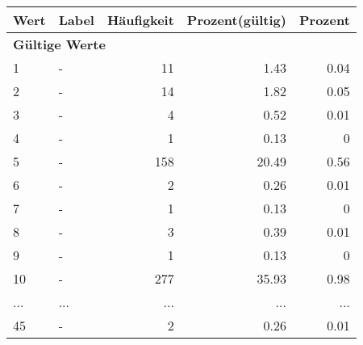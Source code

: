      \begin{longtable}{lXrrr}
     \toprule
     \textbf{Wert} & \textbf{Label} & \textbf{Häufigkeit} & \textbf{Prozent(gültig)} & \textbf{Prozent} \\
     \endhead
     \midrule
     \multicolumn{5}{l}{\textbf{Gültige Werte}}\\
        1 & \multicolumn{1}{X}{-} & %
          \num{11} &
          \num[round-mode=places,round-precision=2]{1,43} &
          \num[round-mode=places,round-precision=2]{0,04} \\
        2 & \multicolumn{1}{X}{-} & %
          \num{14} &
          \num[round-mode=places,round-precision=2]{1,82} &
          \num[round-mode=places,round-precision=2]{0,05} \\
        3 & \multicolumn{1}{X}{-} & %
          \num{4} &
          \num[round-mode=places,round-precision=2]{0,52} &
          \num[round-mode=places,round-precision=2]{0,01} \\
        4 & \multicolumn{1}{X}{-} & %
          \num{1} &
          \num[round-mode=places,round-precision=2]{0,13} &
          \num[round-mode=places,round-precision=2]{0} \\
        5 & \multicolumn{1}{X}{-} & %
          \num{158} &
          \num[round-mode=places,round-precision=2]{20,49} &
          \num[round-mode=places,round-precision=2]{0,56} \\
        6 & \multicolumn{1}{X}{-} & %
          \num{2} &
          \num[round-mode=places,round-precision=2]{0,26} &
          \num[round-mode=places,round-precision=2]{0,01} \\
        7 & \multicolumn{1}{X}{-} & %
          \num{1} &
          \num[round-mode=places,round-precision=2]{0,13} &
          \num[round-mode=places,round-precision=2]{0} \\
        8 & \multicolumn{1}{X}{-} & %
          \num{3} &
          \num[round-mode=places,round-precision=2]{0,39} &
          \num[round-mode=places,round-precision=2]{0,01} \\
        9 & \multicolumn{1}{X}{-} & %
          \num{1} &
          \num[round-mode=places,round-precision=2]{0,13} &
          \num[round-mode=places,round-precision=2]{0} \\
        10 & \multicolumn{1}{X}{-} & %
          \num{277} &
          \num[round-mode=places,round-precision=2]{35,93} &
          \num[round-mode=places,round-precision=2]{0,98} \\
       ... & ... & ... & ... & ... \\
        45 & \multicolumn{1}{X}{-} & %
          \num{2} &
          \num[round-mode=places,round-precision=2]{0,26} &
          \num[round-mode=places,round-precision=2]{0,01} \\


\end{longtable}
